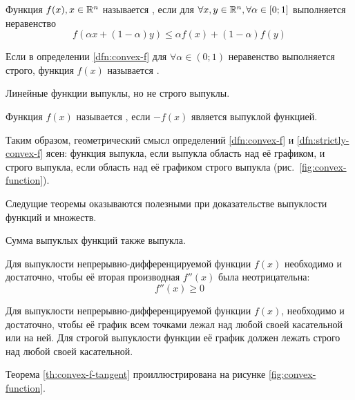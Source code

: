 \begin{dfn}
  \label{dfn:convex-f}
  Функция $f(x), x \in \mathbb{R}^n$ называется , если
  для $\forall x, y \in \mathbb{R}^n, \forall \alpha \in [0;1]$
  выполняется неравенство
  \begin{equation*}
    f(\alpha x + (1-\alpha)y) \leq \alpha f(x) + (1-\alpha) f(y)
  \end{equation*}
\end{dfn}
\begin{dfn}
  \label{dfn:strictly-convex-f}
  Если в определении \ref{dfn:convex-f} для $\forall \alpha \in (0;1)$
  неравенство выполняется строго, функция $f(x)$ называется
  .
\end{dfn}
\begin{rem}
  \label{rem:lin-f-convex}
  Линейные функции выпуклы, но не строго выпуклы.
\end{rem}
\begin{dfn}
  Функция $f(x)$ называется , если $-f(x)$ является
  выпуклой функцией.
\end{dfn}

Таким образом, геометрический смысл определений \ref{dfn:convex-f} и
\ref{dfn:strictly-convex-f} ясен: функция выпукла, если выпукла
область над её графиком, и строго выпукла, если область над её
графиком строго выпукла (рис. \ref{fig:convex-function}).



Следущие теоремы оказываются полезными при доказательстве выпуклости
функций и множеств.

\begin{thm}
  \label{th:convex-f-sum}
  Сумма выпуклых функций также выпукла.
\end{thm}

\begin{thm}
  \label{th:convex-f-diff2}
  Для выпуклости непрерывно-дифференцируемой функции $f(x)$ необходимо
  и достаточно, чтобы её вторая производная $f''(x)$ была
  неотрицательна:
  \begin{equation*}
    f''(x) \geq 0
  \end{equation*}
\end{thm}

\begin{thm}
  \label{th:convex-f-tangent}
  Для выпуклости непрерывно-дифференцируемой функции $f(x)$,
  необходимо и достаточно, чтобы её график всем точками лежал над
  любой своей касательной или на ней. Для строгой выпуклости функции
  её график должен лежать строго над любой своей касательной.
\end{thm}
Теорема \ref{th:convex-f-tangent} проиллюстрирована на рисунке
\ref{fig:convex-function}.

